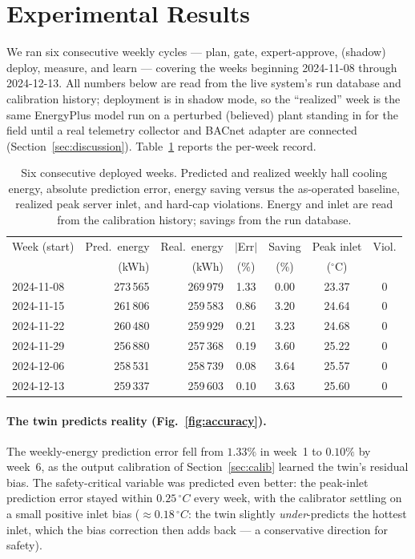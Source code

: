 \documentclass[11pt]{article}
\newcommand{\degC}{\ensuremath{^{\circ}}C}
\begin{document}
\section{Experimental Results}
\label{sec:results}

We ran six consecutive weekly cycles --- plan, gate, expert-approve, (shadow) deploy,
measure, and learn --- covering the weeks beginning 2024-11-08 through 2024-12-13. All
numbers below are read from the live system's run database and calibration history;
deployment is in shadow mode, so the ``realized'' week is the same EnergyPlus model run on
a perturbed (believed) plant standing in for the field until a real telemetry collector and
BACnet adapter are connected (Section~\ref{sec:discussion}). Table~\ref{tab:weeks} reports
the per-week record.

\begin{table}[t]
\centering
\caption{Six consecutive deployed weeks. Predicted and realized weekly hall cooling energy,
absolute prediction error, energy saving versus the as-operated baseline, realized peak
server inlet, and hard-cap violations. Energy and inlet are read from the calibration
history; savings from the run database.}
\label{tab:weeks}
\small
\begin{tabular}{l r r c c c c}
\toprule
Week (start) & Pred.\ energy & Real.\ energy & \(\lvert\)Err\(\rvert\) & Saving & Peak inlet & Viol. \\
 & (kWh) & (kWh) & (\%) & (\%) & (\degC) & \\
\midrule
2024-11-08 & 273\,565 & 269\,979 & 1.33 & 0.00 & 23.37 & 0 \\
2024-11-15 & 261\,806 & 259\,583 & 0.86 & 3.20 & 24.64 & 0 \\
2024-11-22 & 260\,480 & 259\,929 & 0.21 & 3.23 & 24.68 & 0 \\
2024-11-29 & 256\,880 & 257\,368 & 0.19 & 3.60 & 25.22 & 0 \\
2024-12-06 & 258\,531 & 258\,739 & 0.08 & 3.64 & 25.57 & 0 \\
2024-12-13 & 259\,337 & 259\,603 & 0.10 & 3.63 & 25.60 & 0 \\
\bottomrule
\end{tabular}
\end{table}

\paragraph{The twin predicts reality (Fig.~\ref{fig:accuracy}).} The weekly-energy
prediction error fell from \(1.33\%\) in week~1 to \(0.10\%\) by week~6, as the output
calibration of Section~\ref{sec:calib} learned the twin's residual bias. The
safety-critical variable was predicted even better: the peak-inlet prediction error stayed
within \(0.25\,\degC\) every week, with the calibrator settling on a small positive inlet
bias (\(\approx0.18\,\degC\): the twin slightly \emph{under}-predicts the hottest inlet,
which the bias correction then adds back --- a conservative direction for safety).
\end{document}
